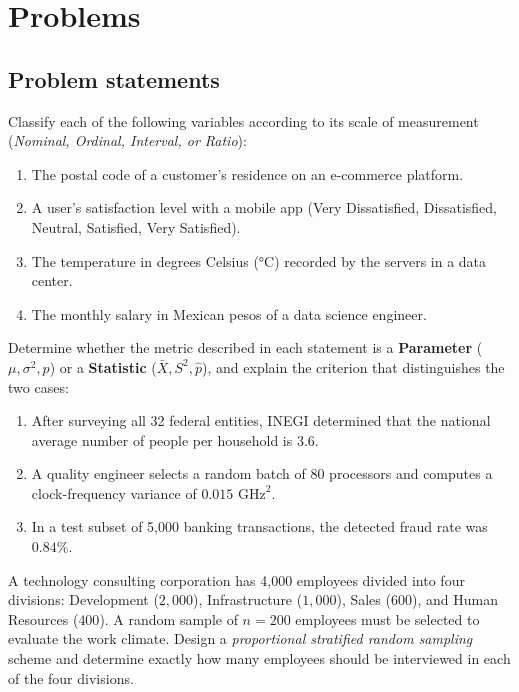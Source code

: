\section*{Problems}

\subsection*{Problem statements}

\begin{problema}
	\label{prob:de3bea1}
	Classify each of the following variables according to its scale of measurement (\emph{Nominal, Ordinal, Interval, or Ratio}):
	\begin{enumerate}
		\item The postal code of a customer's residence on an e-commerce platform.
		\item A user's satisfaction level with a mobile app (Very Dissatisfied, Dissatisfied, Neutral, Satisfied, Very Satisfied).
		\item The temperature in degrees Celsius (°C) recorded by the servers in a data center.
		\item The monthly salary in Mexican pesos of a data science engineer.
	\end{enumerate}
\end{problema}

\begin{problema}
	\label{prob:7b7dc88}
	Determine whether the metric described in each statement is a \textbf{Parameter} ($\mu, \sigma^2, p$) or a \textbf{Statistic} ($\bar{X}, S^2, \hat{p}$), and explain the criterion that distinguishes the two cases:
	\begin{enumerate}
		\item After surveying all 32 federal entities, INEGI determined that the national average number of people per household is $3.6$.
		\item A quality engineer selects a random batch of 80 processors and computes a clock-frequency variance of $0.015 \text{ GHz}^2$.
		\item In a test subset of 5,000 banking transactions, the detected fraud rate was $0.84\%$.
	\end{enumerate}
\end{problema}

\begin{problema}
	\label{prob:4bc23ad}
	A technology consulting corporation has 4,000 employees divided into four divisions: Development ($2,000$), Infrastructure ($1,000$), Sales ($600$), and Human Resources ($400$). A random sample of $n = 200$ employees must be selected to evaluate the work climate. Design a \emph{proportional stratified random sampling} scheme and determine exactly how many employees should be interviewed in each of the four divisions.
\end{problema}

